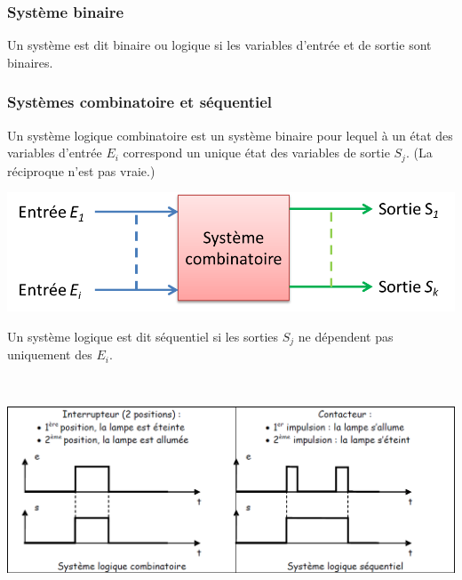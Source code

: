 \subsubsection{Système binaire}

\begin{defi}
Un système est dit binaire ou logique si les variables d'entrée et de sortie sont binaires. 
\end{defi}

\subsubsection{Systèmes combinatoire et séquentiel}
\begin{defi}
Un système logique combinatoire est un système binaire pour lequel à un état des variables d'entrée $E_i$ correspond un unique état des variables de sortie $S_j$. (La réciproque n'est pas vraie.)
\end{defi}

\begin{center}
\includegraphics[width=.6\textwidth]{images/fig_08}
\end{center}

\begin{defi}
Un système logique est dit séquentiel si les sorties $S_j$ ne dépendent pas uniquement des $E_i$.
\end{defi}

\begin{exemple} ~\\

\begin{center}
\includegraphics[width=.9\textwidth]{images/fig_09}
\end{center}

\end{exemple}



